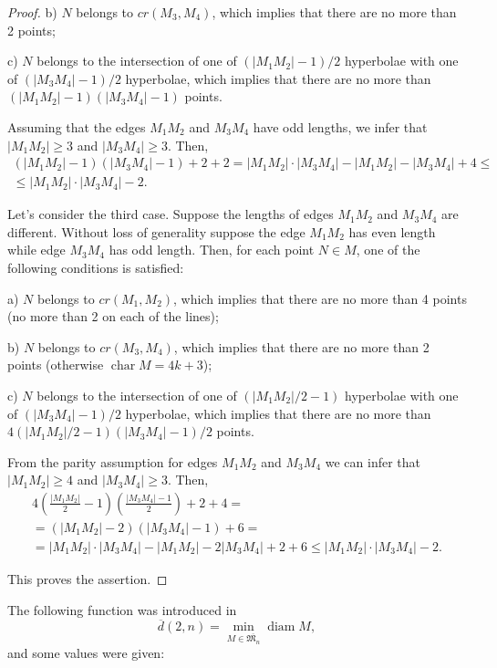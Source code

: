 \documentclass[a4paper,14pt]{article} %
\theoremstyle{plain}
\theoremstyle{definition}
\begin{document}
\begin{proof}
	b) $N$ belongs to $cr(M_3,M_4)$, which implies that there are no more than 2 points;

	c) $N$ belongs to the intersection of one of $(|M_1 M_2|-1)/2$ hyperbolae with one of $(|M_3M_4|-1)/2$ hyperbolae, which implies that there are no more than $(|M_1 M_2|-1)(|M_3 M_4|-1)$ points.

	Assuming that the edges $M_1M_2$ and $M_3M_4$ have odd lengths,
	we infer that $|M_1M_2|\geq3$ and $|M_3M_4|\geq3$.
	Then,
	\begin{multline}
		(|M_1 M_2| - 1)(|M_3 M_4| - 1) + 2 + 2
		=
		|M_1 M_2| \cdot |M_3 M_4| - |M_1 M_2| - |M_3 M_4| + 4
		\leq \\
		\leq |M_1 M_2| \cdot |M_3 M_4| - 2
		.
	\end{multline}

	Let's consider the third case. Suppose the lengths of edges $M_1M_2$ and $M_3M_4$ are different. Without loss of generality suppose the edge $M_1M_2$ has even length while edge $M_3 M_4$ has odd length.
	Then, for each point $N\in M$, one of the following conditions is satisfied:

	a) $N$ belongs to $cr(M_1, M_2)$, which implies that there are no more than 4 points (no more than 2 on each of the lines);

	b) $N$ belongs to $cr(M_3,M_4)$, which implies that there are no more than 2 points (otherwise $\operatorname{char} M = 4k+3$);

	c) $N$ belongs to the intersection of one of $(|{M_1 M_2}|/2-1)$ hyperbolae with one of $(|M_3 M_4|-1)/2$ hyperbolae, which implies that there are no more than $4(|M_1 M_2|/2-1)(|M_3 M_4|-1)/2$ points.

	From the parity assumption for edges $M_1 M_2$ and $M_3 M_4$
	we can infer that $|M_1 M_2|\geq4$ and $|M_3M_4|\geq3$.
	Then,
	\begin{multline}
		4\left(\frac{|M_1 M_2|}{2} - 1\right) \left(\frac{|M_3 M_4| - 1}{2}\right) + 2 + 4
		=
		\\=
		(|M_1 M_2| - 2)(|M_3 M_4| - 1) + 6
		=
		\\=
		|M_1 M_2| \cdot |M_3 M_4| - |M_1 M_2| - 2 |M_3 M_4| + 2 + 6
		\leq
		|M_1 M_2| \cdot |M_3 M_4| - 2
		.
	\end{multline}

	This proves the assertion.
\end{proof}


The following function was introduced in~\cite{kurz2008minimum}
\begin{equation}
	\overline{d}(2,n) = \min_{M\in\overline{\mathfrak{M}_{n}}} \operatorname{diam} M
	,
\end{equation}
and some values were given:
\end{document}
